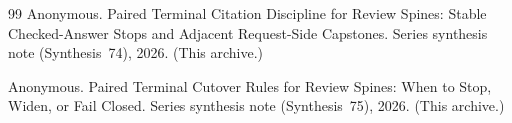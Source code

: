 \documentclass[11pt]{article}
\begin{document}
\begin{thebibliography}{99}
Anonymous.
\newblock Paired Terminal Citation Discipline for Review Spines: Stable Checked-Answer Stops and Adjacent Request-Side Capstones.
\newblock Series synthesis note (Synthesis~74), 2026. (This archive.)

Anonymous.
\newblock Paired Terminal Cutover Rules for Review Spines: When to Stop, Widen, or Fail Closed.
\newblock Series synthesis note (Synthesis~75), 2026. (This archive.)

\end{thebibliography}
\end{document}
